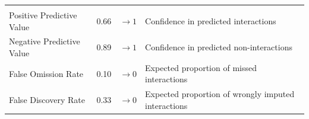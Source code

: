 \documentclass[11pt]{article}
\begin{document}
\begin{longtable}[]{@{}llll@{}}
\begin{minipage}[t]{0.49\columnwidth}
\strut
\end{minipage}\tabularnewline
\begin{minipage}[t]{0.21\columnwidth}\raggedright
Positive Predictive Value\strut
\end{minipage} & \begin{minipage}[t]{0.05\columnwidth}\raggedright
0.66\strut
\end{minipage} & \begin{minipage}[t]{0.13\columnwidth}\raggedright
\(\rightarrow 1\)\strut
\end{minipage} & \begin{minipage}[t]{0.49\columnwidth}\raggedright
Confidence in predicted interactions\strut
\end{minipage}\tabularnewline
\begin{minipage}[t]{0.21\columnwidth}\raggedright
Negative Predictive Value\strut
\end{minipage} & \begin{minipage}[t]{0.05\columnwidth}\raggedright
0.89\strut
\end{minipage} & \begin{minipage}[t]{0.13\columnwidth}\raggedright
\(\rightarrow 1\)\strut
\end{minipage} & \begin{minipage}[t]{0.49\columnwidth}\raggedright
Confidence in predicted non-interactions\strut
\end{minipage}\tabularnewline
\begin{minipage}[t]{0.21\columnwidth}\raggedright
False Omission Rate\strut
\end{minipage} & \begin{minipage}[t]{0.05\columnwidth}\raggedright
0.10\strut
\end{minipage} & \begin{minipage}[t]{0.13\columnwidth}\raggedright
\(\rightarrow 0\)\strut
\end{minipage} & \begin{minipage}[t]{0.49\columnwidth}\raggedright
Expected proportion of missed interactions\strut
\end{minipage}\tabularnewline
\begin{minipage}[t]{0.21\columnwidth}\raggedright
False Discovery Rate\strut
\end{minipage} & \begin{minipage}[t]{0.05\columnwidth}\raggedright
0.33\strut
\end{minipage} & \begin{minipage}[t]{0.13\columnwidth}\raggedright
\(\rightarrow 0\)\strut
\end{minipage} & \begin{minipage}[t]{0.49\columnwidth}\raggedright
Expected proportion of wrongly imputed interactions\strut
\end{minipage}\tabularnewline
\bottomrule
\end{longtable}
\end{document}
